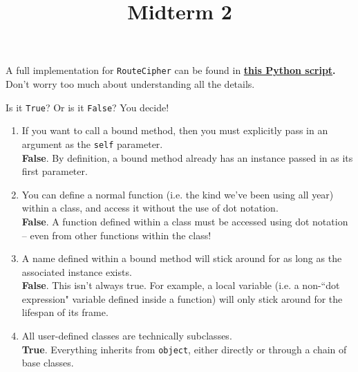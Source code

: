 \documentclass[twoside]{article}
\title{\sc Midterm 2 \solution{Solutions}}
\newcommand{\solution}[1]{{\color{red}#1}}
\begin{document}
\thispagestyle{empty}
\maketitle

\begin{enumerate}

\solution{A full implementation for \texttt{RouteCipher} can be found in \textbf{\href{http://owenjow.xyz/cs61a/fa16/quiz/quiz5.py}{this Python script}.} Don't worry too much about understanding all the details.}


Is it \texttt{True}? Or is it \texttt{False}? You decide!
\vspace{0.1in}

\begin{enumerate}
\item If you want to call a bound method, then you must explicitly pass in an argument as the \texttt{self} parameter.\\

\solution{\textbf{False}. By definition, a bound method already has an instance passed in as its first parameter.}\\

\item You can define a normal function (i.e. the kind we've been using all year) within a class, and access it without the use of dot notation.\\

\solution{\textbf{False}. A function defined within a class must be accessed using dot notation -- even from other functions within the class!}\\

\item A name defined within a bound method will stick around for as long as the associated instance exists.\\

\solution{\textbf{False}. This isn't always true. For example, a local variable (i.e. a non-``dot expression" variable defined inside a function) will only stick around for the lifespan of its frame.}\\

\item All user-defined classes are technically subclasses.\\

\solution{\textbf{True}. Everything inherits from \texttt{object}, either directly or through a chain of base classes.}\\


\end{enumerate}
\end{enumerate}
\end{document}
